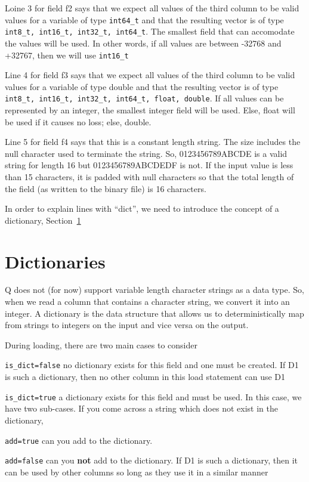 \documentclass[letterpaper]{article}
\begin{document}
\item 
Loine 3 for field f2  says that we expect all values of the third column to
be valid values for a variable of type \verb+int64_t+ and that the
resulting vector is of type
\verb+int8_t, int16_t, int32_t, int64_t+. The smallest field that
can accomodate the values will be used. In other words, if all values are
between -32768 and +32767, then we will use \verb+int16_t+
\item 
Line 4 for field f3 says that we expect all values of the third column to
be valid values for a variable of type double and that the resulting
vector is of type
\verb+int8_t, int16_t, int32_t, int64_t, float, double+. If all values
can be represented by an integer, the smallest integer field will be
used. Else, float will be used if it causes no loss; else, double.
\item Line 5 for field f4 says that this is a constant length string. The size
  includes the null character used to terminate the string. So, 0123456789ABCDE
  is a valid string for length 16 but 0123456789ABCDEDF is not. If the input
  value is less than 15 characters, it is padded with null characters so that
  the total length of the field (as written to the binary file) is 16
  characters. 

\item 
In order to explain lines with ``dict'', we need to introduce the concept of
a dictionary, Section~\ref{dictionary}
\ee

\section{Dictionaries}
\label{dictionary}

Q does not (for now) support variable length character strings as a
data type.  So, when we read a column that contains a character string,
we convert it into an integer. A dictionary is the data structure that allows us
to deterministically map from strings to integers on the input and vice versa on
the output.

During loading, there are two main cases to consider
\be
\item \verb+is_dict=false+ no dictionary exists for this field and one must be created. If D1 is such
  a dictionary, then no other column in this load statement can use D1
\item \verb+is_dict=true+ a dictionary exists for this field and must be used. In this case, we have
  two sub-cases.  If you come across a string which does not exist in the dictionary, 
  \be
\item \verb+add=true+ can you add to the dictionary. 
\item \verb+add=false+ can you {\bf not} add to the dictionary. 
  \ee
  If D1 is such a dictionary, then it can be used by other columns so long as they use it in a similar manner
  \ee
\end{document}
